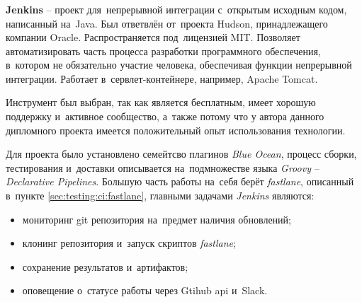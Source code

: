 \subsubsection{}
\label{sec:testing:ci:jenkins}

\textbf{Jenkins} -- проект для~непрерывной интеграции с~открытым исходным кодом, написанный на~Java. Был ответвлён от~проекта Hudson, принадлежащего компании Oracle. Распространяется под~лицензией MIT. Позволяет автоматизировать часть процесса разработки программного обеспечения, в~котором не обязательно участие человека, обеспечивая функции непрерывной интеграции. Работает в~сервлет-контейнере, например, Apache Tomcat\cite{wiki:jenkins}.

Инструмент был выбран, так как является бесплатным, имеет хорошую поддержку и~активное сообщество, а~также потому что у автора данного дипломного проекта имеется положительный опыт использования технологии.

Для проекта было установлено семейтсво плагинов \textit{Blue Ocean}, процесс сборки, тестирования и~доставки описывается на~подмножестве языка \textit{Groovy} -- \textit{Declarative Pipelines}. Большую часть работы на~себя берёт \textit{fastlane}, описанный в~пункте \ref{sec:testing:ci:fastlane}, главными задачами \textit{Jenkins} являются:

\begin{itemize}
	\item мониторинг git репозитория на~предмет наличия обновлений;
	\item клонинг репозитория и~запуск скриптов \textit{fastlane};
	\item сохранение результатов и~артифактов;
	\item оповещение о~статусе работы через Gtihub \gls{api} и~Slack.
\end{itemize}